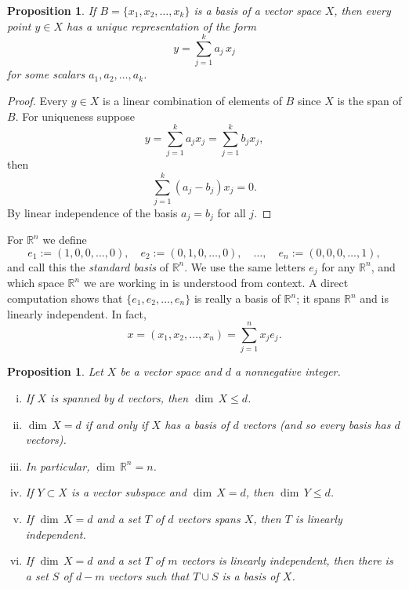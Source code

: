 \documentclass[12pt]{book}
\newcommand{\R}{{\mathbb{R}}}
\newcommand{\myindex}[1]{#1\index{#1}}
\theoremstyle{plain}
\newtheorem{prop}[thm]{Proposition}
\theoremstyle{remark}
\theoremstyle{definition}
\theoremstyle{exercise}
\theoremstyle{example}
\begin{document}
\begin{prop}
If $B = \{ x_1, x_2, \ldots, x_k \}$ is a basis of a vector space $X$, then
every point $y \in X$ has a unique representation of the form
\begin{equation*}
y = \sum_{j=1}^k a_j \, x_j
\end{equation*}
for some scalars $a_1, a_2, \ldots, a_k$.
\end{prop}

\begin{proof}
Every $y \in X$ is a linear combination of elements of $B$
since $X$ is the span of $B$.  For uniqueness
suppose
\begin{equation*}
y = \sum_{j=1}^k a_j x_j = \sum_{j=1}^k b_j x_j ,
\end{equation*}
then
\begin{equation*}
\sum_{j=1}^k (a_j-b_j) x_j = 0 .
\end{equation*}
By linear independence of the basis $a_j = b_j$ for all $j$.
\end{proof}

For $\R^n$
we define
\begin{equation*}
e_1 := (1,0,0,\ldots,0) , \quad
e_2 := (0,1,0,\ldots,0) , \quad \ldots, \quad
e_n := (0,0,0,\ldots,1) ,
\end{equation*}
and call this the \emph{\myindex{standard basis}} of $\R^n$.
We use the same letters $e_j$ for any $\R^n$, and
which space $\R^n$ we are working in is understood from context.
A direct computation shows that $\{ e_1, e_2, \ldots, e_n \}$ is really
a basis of $\R^n$; it spans $\R^n$ and is
linearly independent.  In fact,
\begin{equation*}
x = (x_1,x_2,\ldots,x_n) = \sum_{j=1}^n x_j e_j .
\end{equation*}

\begin{prop} \label{mv:dimprop}
Let $X$ be a vector space and $d$ a nonnegative integer.
\begin{enumerate}[(i)]
\item \label{mv:dimprop:i}
If $X$ is spanned by $d$ vectors, then $\dim \, X \leq d$.
\item \label{mv:dimprop:ii}
$\dim \, X = d$ if and only if $X$ has a basis of $d$
vectors (and so every basis has $d$ vectors).
\item \label{mv:dimprop:iii}
In particular, $\dim \, \R^n = n$.
\item \label{mv:dimprop:iv}
If $Y \subset X$ is a vector subspace and $\dim \, X = d$,
then $\dim \, Y \leq d$.
\item \label{mv:dimprop:v}
If $\dim \, X = d$ and a set $T$ of $d$ vectors spans $X$,
then $T$ is linearly independent.
\item \label{mv:dimprop:vi}
If $\dim \, X = d$ and a set $T$ of $m$ vectors is
linearly independent, then there is a set $S$ of $d-m$
vectors such that $T \cup S$ is a basis of $X$.
\end{enumerate}
\end{prop}
\end{document}
